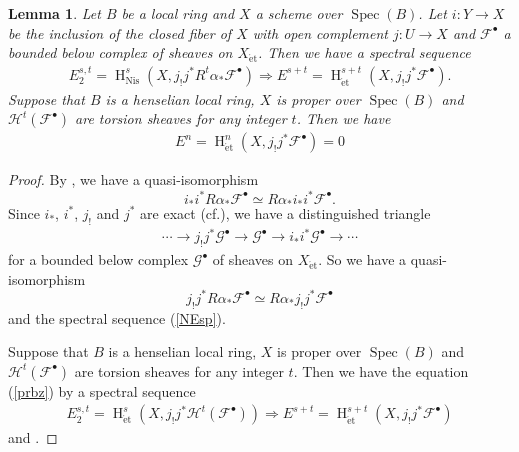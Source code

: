 \documentclass{article}
\newtheorem{lem}[thm]{\indent \sc Lemma}
\newcommand{\spec}{\operatorname{Spec}}
\newcommand{\et}{\mathrm{\acute{e}t}}
\newcommand{\Nis}{\mathrm{Nis}}
\newcommand{\HO}{\operatorname{H}}
\begin{document}
%
\begin{lem}\upshape\label{PTj}
Let $B$ be a local ring and 
$X$ a scheme over $\spec(B)$. 
Let $i: Y\to X$ be the inclusion of the closed fiber of $X$
with open complement
$j: U\to X$
and 
$\mathcal{F}^{\bullet}$ a bounded below complex of 
sheaves on $X_{\et}$.
Then we have a spectral sequence
%
\begin{align}\label{NEsp}
E^{s, t}_{2}=
\HO^{s}_{\Nis}(
X, 
j_{!}j^{*}R^{t}\alpha_{*}\mathcal{F}^{\bullet}
)
\Rightarrow
E^{s+t}
=
\HO^{s+t}_{\et}(
X,
j_{!}j^{*}\mathcal{F}^{\bullet}
).
\end{align}
%
Suppose that $B$ is a henselian local ring, $X$ is proper over $\spec(B)$
and $\mathcal{H}^{t}(\mathcal{F}^{\bullet})$ are torsion sheaves
for any integer $t$. 
Then we have
%
\begin{align}\label{prbz}
E^{n}
=
\HO^{n}_{\et}(
X, 
j_{!}j^{*}\mathcal{F}^{\bullet}
)
=0
\end{align}
%
\end{lem}
%

%
\begin{proof}\upshape
By \cite[p.776, Proposition 2.2]{Ge},
we have a quasi-isomorphism
%
\begin{equation*}
i_{*}i^{*}R\alpha_{*}\mathcal{F}^{\bullet} 
\simeq 
R\alpha_{*}i_{*}i^{*}\mathcal{F}^{\bullet}.
\end{equation*}
%
Since $i_{*}$, $i^{*}$, $j_{!}$ and $j^{*}$
are exact (cf.\cite[p.76, II, Proposition 3.14 (b)]{M}), 
we have 
a distinguished triangle
%
\begin{align*}
\cdots\to 
j_{!}j^{*}\mathcal{G}^{\bullet}
\to
\mathcal{G}^{\bullet}
\to
i_{*}i^{*}\mathcal{G}^{\bullet}
\to\cdots
\end{align*}
%
for a bounded below complex $\mathcal{G}^{\bullet}$
of sheaves on $X_{\et}$.
So we have
a quasi-isomorphism
%
\begin{equation*}
j_{!}j^{*}R\alpha_{*}\mathcal{F}^{\bullet}
\simeq 
R\alpha_{*}j_{!}j^{*}\mathcal{F}^{\bullet}
\end{equation*}
%
and the spectral sequence (\ref{NEsp}).

Suppose that $B$ is a henselian local ring, $X$ is proper over $\spec(B)$
and $\mathcal{H}^{t}(\mathcal{F}^{\bullet})$ are torsion sheaves
for any integer $t$.
Then we have the equation (\ref{prbz})
by a spectral sequence
%
\begin{align*}
E^{s, t}_{2}
=
\HO^{s}_{\et}(
X,
j_{!}j^{*}\mathcal{H}^{t}(\mathcal{F}^{\bullet})
) 
\Rightarrow
E^{s+t}
=
\HO^{s+t}_{\et}(
X,
j_{!}j^{*}
\mathcal{F}^{\bullet}
)
\end{align*}
%
and \cite[p.224, VI, Corollary 2.7]{M}.
\end{proof}
%
\end{document}
